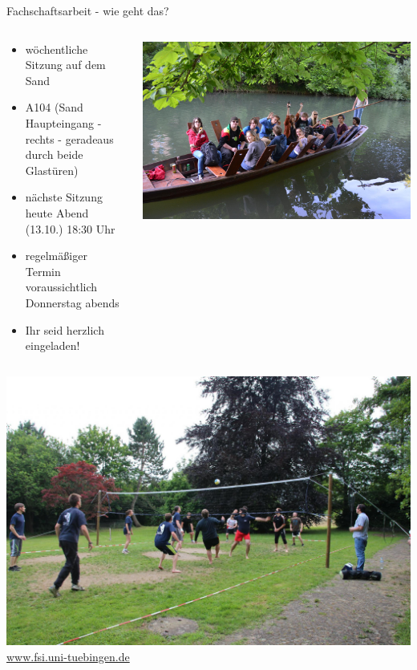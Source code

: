 \documentclass{beamer}
\begin{document}
	\begin{frame}{Fachschaftsarbeit - wie geht das?}
		\begin{columns}
			\begin{column}{.5\linewidth}
				\begin{itemize}
					\item wöchentliche Sitzung auf dem Sand
					\item A104 (Sand Haupteingang - rechts - geradeaus durch beide Glastüren)
					\item nächste Sitzung heute Abend (13.10.) 18:30 Uhr
					\item regelmäßiger Termin voraussichtlich Donnerstag abends
					\item Ihr seid herzlich eingeladen!
				\end{itemize}
			\end{column}
			\begin{column}{0.5\linewidth}
				\includegraphics[width=\linewidth]{Stocherkahn.jpg}
			\end{column}
		\end{columns}
	\end{frame}


	\begin{frame}
		\includegraphics[width=\linewidth]{volleyball_sofe15.jpg}
		\vspace*{2mm}\\
		{\centering\url{www.fsi.uni-tuebingen.de}}
	\end{frame}
\end{document}
